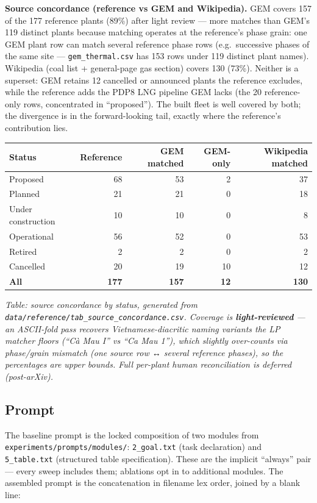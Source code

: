 \documentclass[a4paper,11pt]{article}
\begin{document}
\textbf{Source concordance (reference vs GEM and Wikipedia).} GEM covers
157 of the 177 reference plants (89\%) after light review --- more
matches than GEM's 119 distinct plants because matching operates at the
reference's phase grain: one GEM plant row can match several reference
phase rows (e.g.~successive phases of the same site ---
\texttt{gem\_thermal.csv} has 153 rows under 119 distinct plant names).
Wikipedia (coal list + general-page gas section) covers 130 (73\%).
Neither is a superset: GEM retains 12 cancelled or announced plants the
reference excludes, while the reference adds the PDP8 LNG pipeline GEM
lacks (the 20 reference-only rows, concentrated in ``proposed''). The
built fleet is well covered by both; the divergence is in the
forward-looking tail, exactly where the reference's contribution lies.

\begin{longtable}[]{@{}lrrrr@{}}
\toprule\noalign{}
Status & Reference & GEM matched & GEM-only & Wikipedia matched \\
\midrule\noalign{}
\endhead
\bottomrule\noalign{}
\endlastfoot
Proposed & 68 & 53 & 2 & 37 \\
Planned & 21 & 21 & 0 & 18 \\
Under construction & 10 & 10 & 0 & 8 \\
Operational & 56 & 52 & 0 & 53 \\
Retired & 2 & 2 & 0 & 2 \\
Cancelled & 20 & 19 & 10 & 12 \\
\textbf{All} & \textbf{177} & \textbf{157} & \textbf{12} &
\textbf{130} \\
\end{longtable}

\emph{Table: source concordance by status, generated from
\texttt{data/reference/tab\_source\_concordance.csv}. Coverage is
\textbf{light-reviewed} --- an ASCII-fold pass recovers
Vietnamese-diacritic naming variants the LP matcher floors (``Cà Mau I''
vs ``Ca Mau 1''), which slightly over-counts via phase/grain mismatch
(one source row ↔ several reference phases), so the percentages are
upper bounds. Full per-plant human reconciliation is deferred
(post-arXiv).}

\subsection*{Prompt}

The baseline prompt is the locked composition of two modules from
\texttt{experiments/prompts/modules/}: \texttt{2\_goal.txt} (task
declaration) and \texttt{5\_table.txt} (structured table specification).
These are the implicit ``always'' pair --- every sweep includes them;
ablations opt in to additional modules. The assembled prompt is the
concatenation in filename lex order, joined by a blank line:
\end{document}

